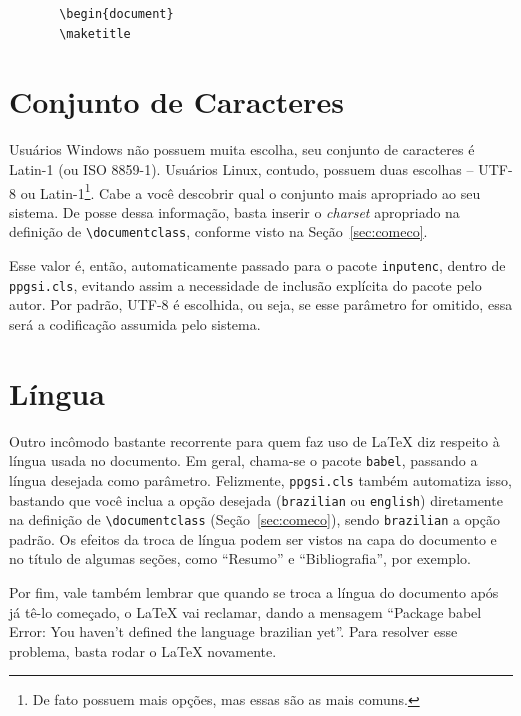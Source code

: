 \documentclass[12pt,a4paper,utf8]{ppgsi}
\begin{document}
	\begin{verbatim}
	   \begin{document}
	   \maketitle
	\end{verbatim}


\section{Conjunto de Caracteres}
\label{sec:charset}

	Usuários Windows não possuem muita escolha, seu conjunto de caracteres é Latin-1 (ou ISO 8859-1). Usuários Linux, contudo, possuem duas escolhas -- UTF-8 ou Latin-1\footnote{De fato possuem mais opções, mas essas são as mais comuns.}. Cabe a você descobrir qual o conjunto mais apropriado ao seu sistema. De posse dessa informação, basta inserir o \textit{charset} apropriado na definição de \verb|\documentclass|, conforme visto na Seção~\ref{sec:comeco}.

	Esse valor é, então, automaticamente passado para o pacote \verb|inputenc|, dentro de \verb|ppgsi.cls|, evitando assim a necessidade de inclusão explícita do pacote pelo autor. Por padrão, UTF-8 é escolhida, ou seja, se esse parâmetro for omitido, essa será a codificação assumida pelo sistema.


\section{Língua}
\label{sec:lingua}

	Outro incômodo bastante recorrente para quem faz uso de \LaTeX{} diz respeito à língua usada no documento. Em geral, chama-se o pacote \verb|babel|, passando a língua desejada como parâmetro. Felizmente, \verb|ppgsi.cls| também automatiza isso, bastando que você inclua a opção desejada (\verb|brazilian| ou \verb|english|) diretamente na definição de \verb|\documentclass| (Seção~\ref{sec:comeco}), sendo \verb|brazilian| a opção padrão. Os efeitos da troca de língua podem ser vistos na capa do documento e no título de algumas seções, como ``Resumo'' e ``Bibliografia'', por exemplo.

	Por fim, vale também lembrar que quando se troca a língua do documento após já tê-lo começado, o \LaTeX{} vai reclamar, dando a mensagem ``Package babel Error: You haven't defined the language brazilian yet''. Para resolver esse problema, basta rodar o \LaTeX{} novamente.
\end{document}
